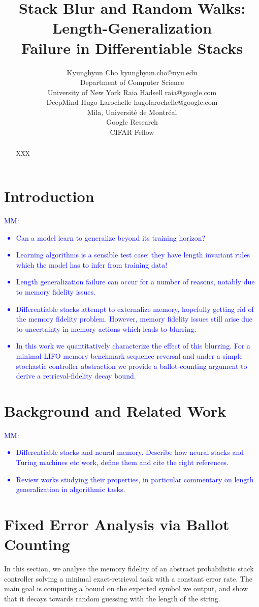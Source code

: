 \documentclass[10pt]{article} %
\title{Stack Blur and Random Walks: Length-Generalization\\ Failure in Differentiable Stacks}
\author{\name Kyunghyun Cho \email kyunghyun.cho@nyu.edu \\
      \addr Department of Computer Science\\
      University of New York
      \AND
      \name Raia Hadsell \email raia@google.com \\
      \addr DeepMind
      \AND
      \name Hugo Larochelle \email hugolarochelle@google.com\\
      \addr Mila, Universit\'e de Montr\'eal \\
      Google Research\\
      CIFAR Fellow}
\newcommand{\mm}[1]{\textcolor{blue}{MM: #1}}
\begin{document}
\maketitle

\begin{abstract}
XXX
\end{abstract}

\section{Introduction}
\mm{
\begin{itemize}
    \item Can a model learn to generalize beyond its training horizon?
    \item Learning algorithms is a sensible test case: they have length invariant rules which the model has to infer from training data!
    \item Length generalization failure can occur for a number of reasons, notably due to memory fidelity issues.
    \item Differentiable stacks attempt to externalize memory, hopefully getting rid of the memory fidelity problem. However, memory fidelity issues still arise due to uncertainty in memory actions which leads to blurring.
    \item In this work we quantitatively characterize the effect of this blurring. For a minimal LIFO memory benchmark sequence reversal and under a simple stochastic controller abstraction we provide a ballot-counting argument to derive a retrieval-fidelity decay bound. 
\end{itemize}
}

\section{Background and Related Work}
\mm{
\begin{itemize}
    \item Differentiable stacks and neural memory. Describe how neural stacks and Turing machines etc work, define them and cite the right references. 
    \item Review works studying their properties, in particular commentary on length generalization in algorithmic tasks.
\end{itemize}
}

\section{Fixed Error Analysis via Ballot Counting}
In this section, we analyse the memory fidelity of an abstract probabilistic stack controller solving a minimal exact-retrieval task with a constant error rate. The main goal is computing a bound on the expected symbol we output, and show that it decays towards random guessing with the length of the string.
\end{document}
